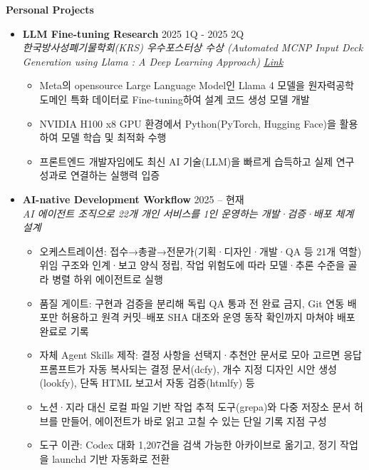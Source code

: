 \documentclass[a4paper, 11pt]{article}
\newcommand{\csubsection}[1]{
    \vspace{5pt}
    {\large \textbf{#1}} \\ \vspace{2pt}
}
\begin{document}
{    \csubsection{Personal Projects}
    \begin{itemize}[leftmargin=*, itemsep=5pt]
        \item \textbf{LLM Fine-tuning Research} \hfill 2025 1Q - 2025 2Q \\
        \textit{한국방사성폐기물학회(KRS) 우수포스터상 수상 (Automated MCNP Input Deck Generation using Llama : A Deep Learning Approach) \href{https://www.krs.or.kr/html/?pmode=academic_societies }{Link}}
        \begin{itemize}[label={-}, noitemsep]
            \item Meta의 opensource Large Language Model인 Llama 4 모델을 원자력공학 도메인 특화 데이터로 Fine-tuning하여 설계 코드 생성 모델 개발
            \item NVIDIA H100 x8 GPU 환경에서 Python(PyTorch, Hugging Face)을 활용하여 모델 학습 및 최적화 수행
            \item 프론트엔드 개발자임에도 최신 AI 기술(LLM)을 빠르게 습득하고 실제 연구 성과로 연결하는 실행력 입증
        \end{itemize}

        \item \textbf{AI-native Development Workflow} \hfill 2025 -- 현재 \\
        \textit{AI 에이전트 조직으로 22개 개인 서비스를 1인 운영하는 개발·검증·배포 체계 설계}
        \begin{itemize}[label={-}, noitemsep, topsep=2pt]
            \item 오케스트레이션: 접수→총괄→전문가(기획·디자인·개발·QA 등 21개 역할) 위임 구조와 인계·보고 양식 정립, 작업 위험도에 따라 모델·추론 수준을 골라 병렬 하위 에이전트로 실행
            \item 품질 게이트: 구현과 검증을 분리해 독립 QA 통과 전 완료 금지, Git 연동 배포만 허용하고 원격 커밋–배포 SHA 대조와 운영 동작 확인까지 마쳐야 배포 완료로 기록
            \item 자체 Agent Skills 제작: 결정 사항을 선택지·추천안 문서로 모아 고르면 응답 프롬프트가 자동 복사되는 결정 문서(dcfy), 개수 지정 디자인 시안 생성(lookfy), 단독 HTML 보고서 자동 검증(htmlfy) 등
            \item 노션·지라 대신 로컬 파일 기반 작업 추적 도구(grepa)와 다중 저장소 문서 허브를 만들어, 에이전트가 바로 읽고 고칠 수 있는 단일 기록 지점 구성
            \item 도구 이관: Codex 대화 1,207건을 검색 가능한 아카이브로 옮기고, 정기 작업을 launchd 기반 자동화로 전환
        \end{itemize}


\end{itemize}}
\end{document}
